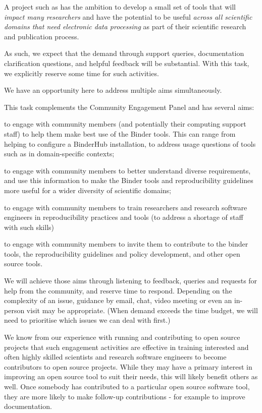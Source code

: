 \begin{task}[
  title=Community support and engagement,
  id=community-support,
  lead=SRL,
  PM=13,
  partners={MP,QS,UIO,IFR}
]
A project such as \TheProject{} has the ambition to develop a small set of tools
that will \emph{impact many researchers} and have the potential to be useful
\emph{across all scientific domains that need electronic data processing} as part of their
scientific research and publication process.

As such, we expect that the demand through support queries, documentation
clarification questions, and helpful feedback will be substantial. With this
task, we explicitly reserve some time for such activities.

We have an opportunity here to address multiple aims simultaneously.

This task complements the Community Engagement Panel and has several aims: 
\begin{compactitem}
\item to engage with community members (and potentially their computing support
  staff) to help them make best use of the Binder tools. This can range from
  helping to configure a BinderHub installation, to address usage questions of
  tools such as \repotodocker{} in domain-specific contexts;
\item to engage with community members to better understand diverse
  requirements, and use this information to make the Binder tools and
  reproducibility guidelines more useful for a wider diversity of scientific
  domains;
\item to engage with community members to train researchers and research
  software engineers in reproducibility practices and tools (to address a
  shortage of staff with such skills)
\item to engage with community members to invite them to contribute to the
  binder tools, the reproducibility guidelines and policy development, and other
  open source tools.
\end{compactitem}

We will achieve those aims through listening to feedback, queries and requests
for help from the community, and reserve time to respond. Depending on the
complexity of an issue, guidance by email, chat, video meeting or even an
in-person visit may be appropriate. (When demand exceeds the time budget, we
will need to prioritise which issues we can deal with first.)

We know from our experience with running and contributing to open source
projects that such engagement activities are effective in training interested
and often highly skilled scientists and research software engineers to become
contributors to open source projects. While they may have a primary interest in
improving an open source tool to suit their needs, this will likely benefit
others as well. Once somebody has contributed to a particular open source
software tool, they are more likely to make follow-up contributions - for
example to improve documentation.

\end{task}
